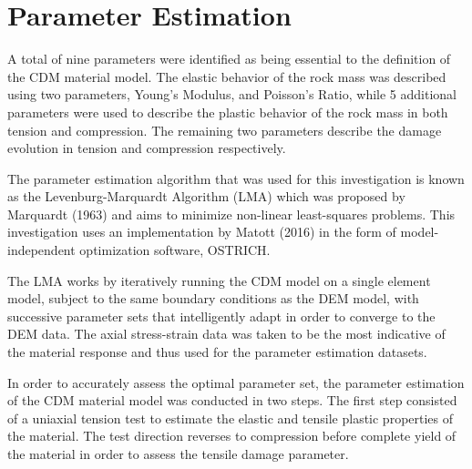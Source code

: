 \section{Parameter Estimation}
A total of nine parameters were identified as being essential to the definition of the CDM material model. The elastic behavior of the rock mass was described using two parameters, Young’s Modulus, and Poisson’s Ratio, while 5 additional parameters were used to describe the plastic behavior of the rock mass in both tension and compression. The remaining two parameters describe the damage evolution in tension and compression respectively. 

The parameter estimation algorithm that was used for this investigation is known as the Levenburg-Marquardt Algorithm (LMA) which was proposed by Marquardt (1963) and aims to minimize non-linear least-squares problems. This investigation uses an implementation by Matott (2016) in the form of model-independent optimization software, OSTRICH.

The LMA works by iteratively running the CDM model on a single element model, subject to the same boundary conditions as the DEM model, with successive parameter sets that intelligently adapt in order to converge to the DEM data. The axial stress-strain data was taken to be the most indicative of the material response and thus used for the parameter estimation datasets.

In order to accurately assess the optimal parameter set, the parameter estimation of the CDM material model was conducted in two steps. The first step consisted of a uniaxial tension test to estimate the elastic and tensile plastic properties of the material. The test direction reverses to compression before complete yield of the material in order to assess the tensile damage parameter. 

